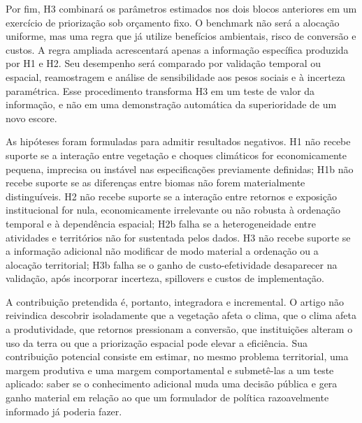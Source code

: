 
Por fim, H3 combinará os parâmetros estimados nos dois blocos anteriores em um exercício de priorização sob orçamento fixo. O benchmark não será a alocação uniforme, mas uma regra que já utilize benefícios ambientais, risco de conversão e custos. A regra ampliada acrescentará apenas a informação específica produzida por H1 e H2. Seu desempenho será comparado por validação temporal ou espacial, reamostragem e análise de sensibilidade aos pesos sociais e à incerteza paramétrica. Esse procedimento transforma H3 em um teste de valor da informação, e não em uma demonstração automática da superioridade de um novo escore.


As hipóteses foram formuladas para admitir resultados negativos. H1 não recebe suporte se a interação entre vegetação e choques climáticos for economicamente pequena, imprecisa ou instável nas especificações previamente definidas; H1b não recebe suporte se as diferenças entre biomas não forem materialmente distinguíveis. H2 não recebe suporte se a interação entre retornos e exposição institucional for nula, economicamente irrelevante ou não robusta à ordenação temporal e à dependência espacial; H2b falha se a heterogeneidade entre atividades e territórios não for sustentada pelos dados. H3 não recebe suporte se a informação adicional não modificar de modo material a ordenação ou a alocação territorial; H3b falha se o ganho de custo-efetividade desaparecer na validação, após incorporar incerteza, spillovers e custos de implementação.







A contribuição pretendida é, portanto, integradora e incremental. O artigo não reivindica descobrir isoladamente que a vegetação afeta o clima, que o clima afeta a produtividade, que retornos pressionam a conversão, que instituições alteram o uso da terra ou que a priorização espacial pode elevar a eficiência. Sua contribuição potencial consiste em estimar, no mesmo problema territorial, uma margem produtiva e uma margem comportamental e submetê-las a um teste aplicado: saber se o conhecimento adicional muda uma decisão pública e gera ganho material em relação ao que um formulador de política razoavelmente informado já poderia fazer.

